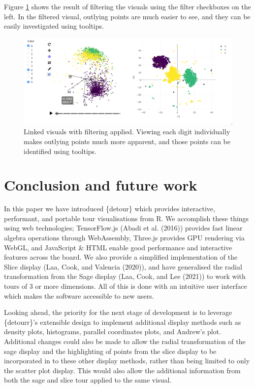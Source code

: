 Figure \ref{fig:linked-tsne-filter} shows the result of filtering the visuals using the filter checkboxes on the left. In the filtered visual, outlying points are much easier to see, and they can be easily investigated using tooltips.

\begin{figure}
\includegraphics[width=\textwidth]{figures/mnist/case-study-linked-brushing-filter} \caption{Linked visuals with filtering applied. Viewing each digit individually makes outlying points much more apparent, and those points can be identified using tooltips.}\label{fig:linked-tsne-filter}
\end{figure}

\pagebreak

\hypertarget{ch:futurework}{%
\section{Conclusion and future work}\label{ch:futurework}}

In this paper we have introduced \{detour\} which provides interactive, performant, and portable tour visualisations from R. We accomplish these things using web technologies; TensorFlow.js (Abadi et al. (2016)) provides fast linear algebra operations through WebAssembly, Three.js provides GPU rendering via WebGL, and JavaScript \& HTML enable good performance and interactive features across the board. We also provide a simplified implementation of the Slice display (Laa, Cook, and Valencia (2020)), and have generalised the radial transformation from the Sage display (Laa, Cook, and Lee (2021)) to work with tours of 3 or more dimensions. All of this is done with an intuitive user interface which makes the software accessible to new users.

Looking ahead, the priority for the next stage of development is to leverage \{detourr\}'s extensible design to implement additional display methods such as density plots, histograms, parallel coordinates plots, and Andrew's plot. Additional changes could also be made to allow the radial transformation of the sage display and the highlighting of points from the slice display to be incorporated in to these other display methods, rather than being limited to only the scatter plot display. This would also allow the additional information from both the sage and slice tour applied to the same visual.

